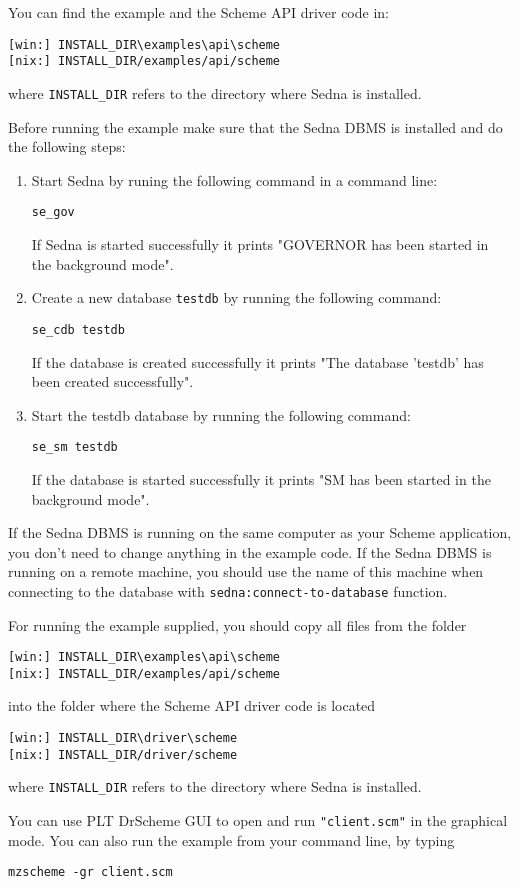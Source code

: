 \documentclass[a4paper,12pt]{article}
\begin{document}
You can find the example and the Scheme API driver code in:
\begin{verbatim}
[win:] INSTALL_DIR\examples\api\scheme
[nix:] INSTALL_DIR/examples/api/scheme
\end{verbatim}
where \verb!INSTALL_DIR! refers to the directory where Sedna is installed.

Before running the example make sure that the Sedna DBMS is installed and do the following steps:
\begin{enumerate}
\item Start Sedna by runing the following command in a command line:
\begin{verbatim}
se_gov
\end{verbatim}
If Sedna is started successfully it prints "GOVERNOR has been started in
the background mode".
\item Create a new database \verb!testdb! by running the following command:
\begin{verbatim}
se_cdb testdb
\end{verbatim}
If the database is created successfully it prints "The database 'testdb'
has been created successfully".
\item Start the testdb database by running the following command:
\begin{verbatim}
se_sm testdb
\end{verbatim}
If the database is started successfully it prints "SM has been started in
the background mode".
\end{enumerate}

If the Sedna DBMS is running on the same computer as your Scheme application,
you don't need to change anything in the example code.
If the Sedna DBMS is running on a remote machine, you should use the name of
this machine when connecting to the database with
\texttt{sedna:connect-to-database} function.

For running the example supplied, you should copy all files from the folder
\begin{verbatim}
[win:] INSTALL_DIR\examples\api\scheme
[nix:] INSTALL_DIR/examples/api/scheme
\end{verbatim}
into the folder where the Scheme API driver code is located
\begin{verbatim}
[win:] INSTALL_DIR\driver\scheme
[nix:] INSTALL_DIR/driver/scheme
\end{verbatim}
where \verb!INSTALL_DIR! refers to the directory where Sedna is installed.

You can use PLT DrScheme GUI to open and run \texttt{"client.scm"} in the
graphical mode.
You can also run the example from your command line, by typing
\begin{verbatim}mzscheme -gr client.scm\end{verbatim}
\end{document}
